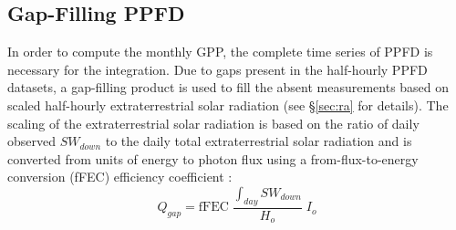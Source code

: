 \subsection{Gap-Filling PPFD}
\label{sec:mst2gfppfd}
In order to compute the monthly GPP, the complete time series of PPFD is necessary for the integration. 
Due to gaps present in the half-hourly PPFD datasets, a gap-filling product is used to fill the absent measurements based on scaled half-hourly extraterrestrial solar radiation (see \S \ref{sec:ra} for details).
The scaling of the extraterrestrial solar radiation is based on the ratio of daily observed $SW_{down}$ to the daily total extraterrestrial solar radiation and is converted from units of energy to photon flux using a from-flux-to-energy conversion (fFEC) efficiency coefficient \parencite{ge11}:
\begin{equation}
\label{eq:gapfill}
    Q_{gap} = \text{fFEC} \; \frac{\int_{day} SW_{down}}{H_o} \; I_o
\end{equation}

